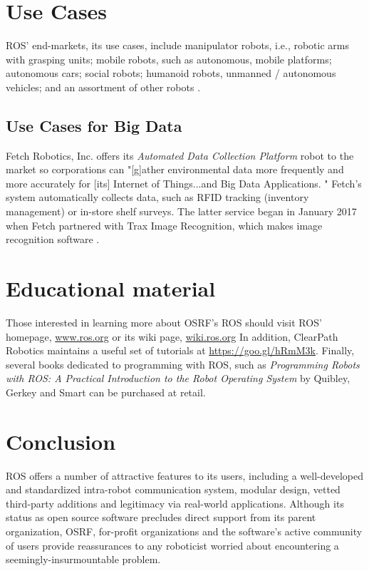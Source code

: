 \documentclass[9pt,twocolumn,twoside]{../../styles/osajnl}
\begin{document}
\section{Use Cases}
ROS' end-markets, its use cases, include manipulator robots, i.e., robotic arms with grasping units; mobile robots, such as autonomous, mobile platforms; autonomous cars; social robots; humanoid robots, unmanned / autonomous vehicles; and an assortment of other robots \cite{www-ros-ecosystem}.


\subsection{Use Cases for Big Data}

Fetch Robotics, Inc. offers its \textit{Automated Data Collection Platform} robot to the market so corporations can "[g]ather environmental data more frequently and more accurately for [its] Internet of Things...and Big Data Applications. \cite{www-ros-fetch}" Fetch's system automatically collects data, such as RFID tracking (inventory management) or in-store shelf surveys. The latter service began in January 2017 when Fetch partnered with Trax Image Recognition, which makes image recognition software \cite{www-ros-trax}.  

\section{Educational material}

Those interested in learning more about OSRF's ROS should visit ROS' homepage, \url{www.ros.org} or its wiki page, \url{wiki.ros.org}  In addition, ClearPath Robotics maintains a useful set of tutorials at \url{https://goo.gl/hRmM3k}.  Finally, several books dedicated to programming with ROS, such as \textit{Programming Robots with ROS: A Practical Introduction to the Robot Operating System} by Quibley, Gerkey and Smart can be purchased at retail.
\section{Conclusion}

ROS offers a number of attractive features to its users, including a well-developed and standardized intra-robot communication system, modular design, vetted third-party additions and legitimacy via real-world applications.  Although its status as open source software precludes direct support from its parent organization, OSRF, for-profit organizations and the software's active community of users provide reassurances to any roboticist worried about encountering a seemingly-insurmountable problem.   
\end{document}
